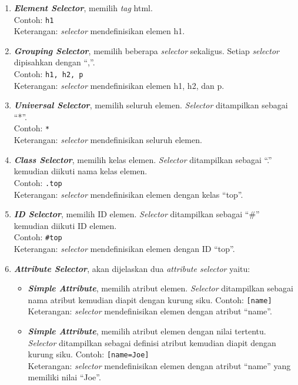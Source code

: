 \begin{enumerate}
	\item \textit{\textbf{Element Selector}}, memilih \textit{tag} html.\\
		Contoh: \texttt{h1}\\
		Keterangan: \textit{selector} mendefinisikan elemen h1.
	\item \textit{\textbf{Grouping Selector}}, memilih beberapa \textit{selector} sekaligus. Setiap \textit{selector} dipisahkan dengan ``,''.\\
		Contoh: \texttt{h1, h2, p}\\
		Keterangan: \textit{selector} mendefinisikan elemen h1, h2, dan p.
	\item \textit{\textbf{Universal Selector}}, memilih seluruh elemen. \textit{Selector} ditampilkan sebagai ``*''.\\
		Contoh: \texttt{*}\\
		Keterangan: \textit{selector} mendefinisikan seluruh elemen.
	\item \textit{\textbf{Class Selector}}, memilih kelas elemen. \textit{Selector} ditampilkan sebagai ``.'' kemudian diikuti nama kelas elemen.\\
		Contoh: \texttt{.top}\\
		Keterangan: \textit{selector} mendefinisikan elemen dengan kelas ``top''.
	\item \textit{\textbf{ID Selector}}, memilih ID elemen. \textit{Selector} ditampilkan sebagai ``\#'' kemudian diikuti ID elemen.\\
		Contoh: \texttt{\#top}\\
		Keterangan: \textit{selector} mendefinisikan elemen dengan ID ``top''. 
	\item \textit{\textbf{Attribute Selector}}, akan dijelaskan dua \textit{attribute selector} yaitu:
		\begin{itemize}
			\item \textit{\textbf{Simple Attribute}}, memilih atribut elemen. \textit{Selector} ditampilkan sebagai nama atribut kemudian diapit dengan kurung siku.
			Contoh: \texttt{[name]}\\
			Keterangan: \textit{selector} mendefinisikan elemen dengan atribut ``name''. 
			
			\item \textit{\textbf{Simple Attribute}}, memilih atribut elemen dengan nilai tertentu. \textit{Selector} ditampilkan sebagai definisi atribut kemudian diapit dengan kurung siku.
			Contoh: \texttt{[name=Joe]}\\
			Keterangan: \textit{selector} mendefinisikan elemen dengan atribut ``name'' yang memiliki nilai ``Joe''. 
		\end{itemize}
		

\end{enumerate}
